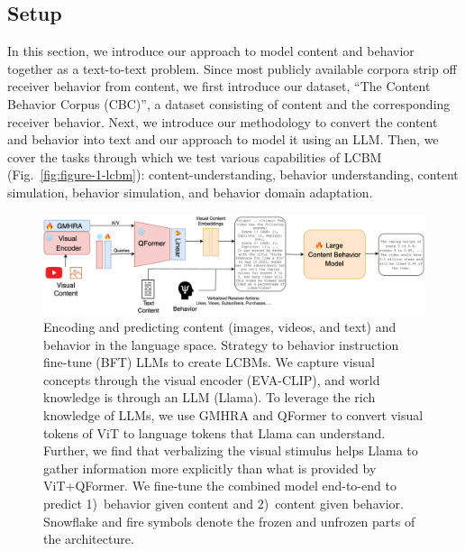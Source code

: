 \subsection{Setup}
\label{sec:Setup}
In this section, we introduce our approach to model content and behavior together as a text-to-text problem. Since most publicly available corpora strip off receiver behavior from content, we first introduce our dataset, ``The Content Behavior Corpus (CBC)'', a dataset consisting of content and the corresponding receiver behavior. Next, we introduce our methodology to convert the content and behavior into text and our approach to model it using an LLM. Then, we cover the tasks through which we test various capabilities of LCBM (Fig.~\ref{fig:figure-1-lcbm}): content-understanding, behavior understanding, content simulation, behavior simulation, and behavior domain adaptation. 


\begin{figure}[!t]
\centering
    \includegraphics[width=\textwidth]{images/content-behavior-architecture.pdf}
    \caption{Encoding and predicting content (images, videos, and text) and behavior in the language space. Strategy to behavior instruction fine-tune (BFT) LLMs to create LCBMs. We capture visual concepts through the visual encoder (EVA-CLIP), and world knowledge is through an LLM (Llama). To leverage the rich knowledge of LLMs, we use GMHRA and QFormer to convert visual tokens of ViT to language tokens that Llama can understand. Further, we find that verbalizing the visual stimulus helps Llama to gather information more explicitly than what is provided by ViT+QFormer. We fine-tune the combined model end-to-end to predict 1)~behavior given content and 2)~content given behavior. Snowflake and fire symbols denote the frozen and unfrozen parts of the architecture. }
    \label{fig:lcbm-architecture}
\end{figure}



